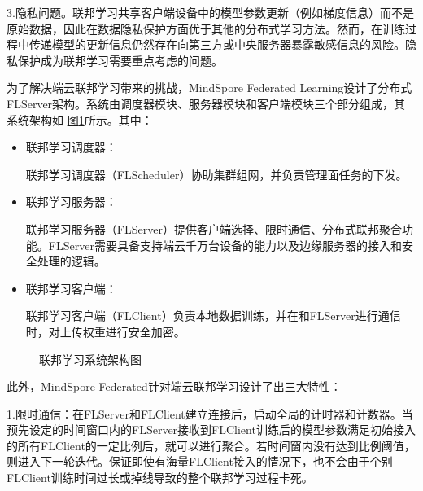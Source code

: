 \documentclass[letterpaper,10pt,english]{sphinxmanual}
\begin{document}
\sphinxAtStartPar
3.隐私问题。联邦学习共享客户端设备中的模型参数更新（例如梯度信息）而不是原始数据，因此在数据隐私保护方面优于其他的分布式学习方法。然而，在训练过程中传递模型的更新信息仍然存在向第三方或中央服务器暴露敏感信息的风险。隐私保护成为联邦学习需要重点考虑的问题。

\sphinxAtStartPar
为了解决端云联邦学习带来的挑战，MindSpore Federated
Learning设计了分布式FL\sphinxhyphen{}Server架构。系统由调度器模块、服务器模块和客户端模块三个部分组成，其系统架构如
\hyperref[\detokenize{chapter_federated_learning/horizontal_fl:ch10-federated-learning-architecture}]{图\ref{\detokenize{chapter_federated_learning/horizontal_fl:ch10-federated-learning-architecture}}}所示。其中：
\begin{itemize}
\item {} 
\sphinxAtStartPar
联邦学习调度器：

\sphinxAtStartPar
联邦学习调度器（FL\sphinxhyphen{}Scheduler）协助集群组网，并负责管理面任务的下发。

\item {} 
\sphinxAtStartPar
联邦学习服务器：

\sphinxAtStartPar
联邦学习服务器（FL\sphinxhyphen{}Server）提供客户端选择、限时通信、分布式联邦聚合功能。FL\sphinxhyphen{}Server需要具备支持端云千万台设备的能力以及边缘服务器的接入和安全处理的逻辑。

\item {} 
\sphinxAtStartPar
联邦学习客户端：

\sphinxAtStartPar
联邦学习客户端（FL\sphinxhyphen{}Client）负责本地数据训练，并在和FL\sphinxhyphen{}Server进行通信时，对上传权重进行安全加密。

\end{itemize}

\begin{figure}[H]
\centering
\capstart

\noindent{}
\caption{联邦学习系统架构图}\label{\detokenize{chapter_federated_learning/horizontal_fl:id11}}\label{\detokenize{chapter_federated_learning/horizontal_fl:ch10-federated-learning-architecture}}\end{figure}

\sphinxAtStartPar
此外，MindSpore Federated针对端云联邦学习设计了出三大特性：

\sphinxAtStartPar
1.限时通信：在FL\sphinxhyphen{}Server和FL\sphinxhyphen{}Client建立连接后，启动全局的计时器和计数器。当预先设定的时间窗口内的FL\sphinxhyphen{}Server接收到FL\sphinxhyphen{}Client训练后的模型参数满足初始接入的所有FL\sphinxhyphen{}Client的一定比例后，就可以进行聚合。若时间窗内没有达到比例阈值，则进入下一轮迭代。保证即使有海量FL\sphinxhyphen{}Client接入的情况下，也不会由于个别FL\sphinxhyphen{}Client训练时间过长或掉线导致的整个联邦学习过程卡死。
\end{document}
